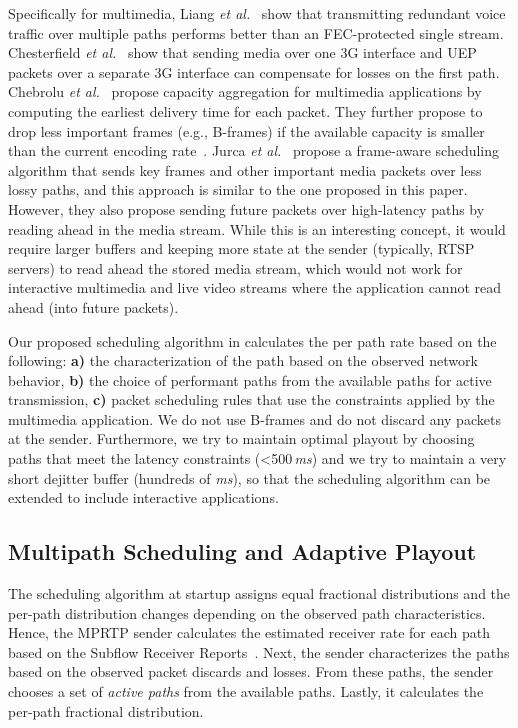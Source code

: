 Specifically for multimedia, Liang \emph{et al.}~\cite{Liang01} show that
transmitting redundant voice traffic over multiple paths performs better than 
an FEC-protected single stream. Chesterfield \emph{et al.}~\cite{1498479}
show that sending media over one 3G interface and UEP packets over a separate 
3G interface can compensate for losses on the first path. 
Chebrolu \emph{et al.}~\cite{1599407} propose capacity aggregation for
multimedia applications by computing the earliest delivery time for each
packet. They further propose to drop less important frames (e.g., B-frames) if
the available capacity is smaller than the current encoding
rate~\cite{1313320}. Jurca \emph{et al.}~\cite{4130370:jurca} propose a
frame-aware scheduling algorithm that sends key frames and other important
media packets over less lossy paths, and this approach is similar to the one
proposed in this paper. However, they also propose sending future packets over
high-latency paths by reading ahead in the media stream. While this is an
interesting concept, it would require larger buffers and keeping more state at the
sender (typically, RTSP servers) to read ahead the stored media stream, which
would not work for interactive multimedia and live video streams where the 
application cannot read ahead (into future packets).

Our proposed scheduling algorithm in  calculates the per path
rate based on the following: \textbf{a)} the characterization of the path based on
the observed network behavior, \textbf{b)} the choice of performant paths from the
available paths for active transmission, \textbf{c)} packet scheduling
rules that use the constraints applied by the multimedia application. We do
not use B-frames and do not discard any packets at the sender. Furthermore, we
try to maintain optimal playout by choosing paths that meet the latency
constraints (<500\,\emph{ms}) and we try to maintain a very short dejitter
buffer (hundreds of \emph{ms}), so that the scheduling algorithm can be extended
to include interactive applications.

\subsection{Multipath Scheduling and Adaptive Playout}

The scheduling algorithm at startup assigns equal fractional distributions and
the per-path distribution changes depending on the observed path
characteristics. Hence, the MPRTP sender calculates the estimated receiver
rate for each path based on the Subflow Receiver Reports~\cite{draft.mprtp}.
Next, the sender characterizes the paths based on the observed packet discards
and losses. From these paths, the sender chooses a set of \emph{active paths}
from the available paths. Lastly, it calculates the per-path fractional
distribution.

